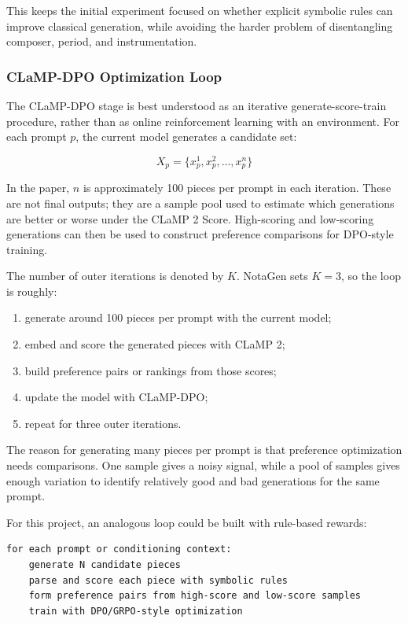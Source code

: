 \documentclass[11pt]{article}
\begin{document}
This keeps the initial experiment focused on whether explicit symbolic rules can
improve classical generation, while avoiding the harder problem of disentangling
composer, period, and instrumentation.

\subsubsection{CLaMP-DPO Optimization Loop}

The CLaMP-DPO stage is best understood as an iterative generate-score-train
procedure, rather than as online reinforcement learning with an environment. For
each prompt \(p\), the current model generates a candidate set:

\[
X_p = \{x_p^1, x_p^2, \ldots, x_p^n\}
\]

In the paper, \(n\) is approximately 100 pieces per prompt in each iteration.
These are not final outputs; they are a sample pool used to estimate which
generations are better or worse under the CLaMP 2 Score. High-scoring and
low-scoring generations can then be used to construct preference comparisons for
DPO-style training.

The number of outer iterations is denoted by \(K\). NotaGen sets \(K=3\), so the
loop is roughly:

\begin{enumerate}[leftmargin=*]
  \item generate around 100 pieces per prompt with the current model;
  \item embed and score the generated pieces with CLaMP 2;
  \item build preference pairs or rankings from those scores;
  \item update the model with CLaMP-DPO;
  \item repeat for three outer iterations.
\end{enumerate}

The reason for generating many pieces per prompt is that preference optimization
needs comparisons. One sample gives a noisy signal, while a pool of samples gives
enough variation to identify relatively good and bad generations for the same
prompt.

For this project, an analogous loop could be built with rule-based rewards:

\begin{verbatim}
for each prompt or conditioning context:
    generate N candidate pieces
    parse and score each piece with symbolic rules
    form preference pairs from high-score and low-score samples
    train with DPO/GRPO-style optimization
\end{verbatim}
\end{document}
